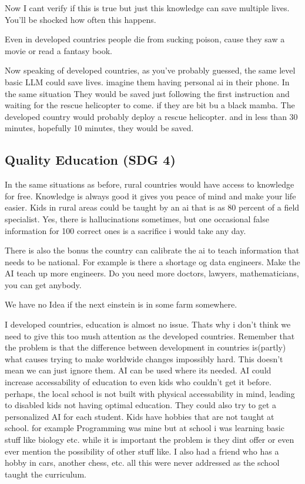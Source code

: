 Now I cant verify if this is true but just this knowledge can save multiple lives. You'll be shocked how often this happens.

Even in developed countries people die from sucking poison, cause they saw a movie or read a fantasy book.

Now speaking of developed countries, as you've probably guessed, the same level basic LLM could save lives. imagine them having personal ai in their phone. In the same situation They would be saved just following the first instruction and waiting for the rescue helicopter to come. if they are bit bu a black mamba. The developed country would probably deploy a rescue helicopter. and in less than 30 minutes, hopefully 10 minutes, they would be saved.


\subsection{Quality Education (SDG 4)}
In the same situations as before, rural countries would have access to knowledge for free. Knowledge is always good it gives you peace of mind and make your life easier.
Kids in rural areas could be taught by an ai that is as 80 percent of a field specialist. Yes, there is hallucinations sometimes, but one occasional false information for 100 correct ones is a sacrifice i would take any day.

There is also the bonus the country can calibrate the ai to teach information that needs to be national. For example is there a shortage og data engineers. Make the AI teach up more engineers. Do you need more doctors, lawyers, mathematicians, you can get anybody. 

We have no Idea if the next einstein is in some farm somewhere.

I developed countries, education is almost no issue. Thats why i don't think we need to give this too mush attention as the developed countries. Remember that the problem is that the difference between development in countries is(partly) what causes trying to make worldwide changes impossibly hard. This doesn't mean we can just ignore them. AI can be used where its needed. AI could increase accessability of education to even kids who couldn't get it before. perhaps, the local school is not built with physical accessability in mind, leading to disabled kids not having optimal education. They could also try to get a personalized AI for each student. Kids have hobbies that are not taught at school. for example Programming was mine but at school i was learning basic stuff like biology etc. while it is important the problem is they dint offer or even ever mention the possibility of other stuff like. I also had a friend who has a hobby in cars, another chess, etc. all this were never addressed as the school taught the curriculum.

